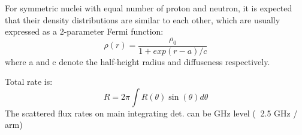 For symmetric nuclei with equal number of proton and neutron, it is expected 
that their density distributions are similar to each other, which are usually
expressed as a 2-parameter Fermi function:
\begin{equation}
    \rho(r) = \frac{\rho_0}{1 + exp(r-a)/c}
\end{equation}
where a and c denote the half-height radius and diffuseness respectively. 

Total rate is:
\begin{equation*}
    R = 2\pi \int R(\theta)\sin(\theta)d\theta
\end{equation*}
The scattered flux rates on main integrating det. can be GHz level ($~$ 2.5 GHz / arm)




\begin{comment}
    The measured asymmetry will be:
    \begin{equation*}
	\CA = \frac{2\pi}{R} \int \CA_0(\theta)R(\theta)d\theta
    \end{equation*}

    Define sensitivity as:
    \begin{equation*}
	S(\theta) = \frac{|\CA_0(\theta) - \CA_1(\theta)|}{\CA_0(\theta)}
    \end{equation*}
    where $\CA_1$ is the asym. for 1\% change in radius. Then we can 
    calculate the total sensitivity:
    \begin{equation*}
	S = \frac{2\pi}{R} \int S(\theta)R(\theta)d\theta
    \end{equation*}

    For PREX-II: average sensitivity reduced by 5\% due to ${}^{12}C$ contamination
    For CREX: average sensitivity reduced by 10\% due to ${}^{40}Ca$ contamination
\end{comment}

